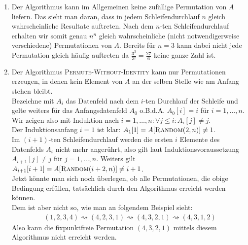 \begin{solution}

\phantom{}

\begin{enumerate}[label = \alph*)]
  \item Der Algorithmus kann im Allgemeinen keine zufällige Permutation von $A$ liefern.
  Das sieht man daran, dass in jedem Schleifendurchlauf $n$ gleich wahrscheinliche
  Resultate auftreten. Nach dem $n$-ten Schleifendurchlauf erhalten wir somit
  genau $n^n$ gleich wahrscheinliche (nicht notwendigerweise verschiedene) Permutationen von $A$. Bereits für $n = 3$
  kann dabei nicht jede Permutation gleich häufig auftreten da $\frac{3^3}{3!} = \frac{27}{6}$
  keine ganze Zahl ist.
  \item Der Algorithmus \textsc{Permute-Without-Identity} kann nur Permutationen
  erzeugen, in denen kein Element von $A$ an der selben Stelle wie am Anfang stehen bleibt. \\
  Bezeichne mit $A_i$ das Datenfeld nach dem $i$-ten Durchlauf der Schleife und
  gelte weiters für das Anfangsdatenfeld $A_0$ o.B.d.A. $A_0[i] = i$ für $i = 1,\dots,n$. \\
  Wir zeigen also mit Induktion nach $i = 1,\dots,n: \forall j \leq i: A_i[j] \neq j$. \\
  Der Induktionsanfang $i = 1$ ist klar: $A_1[1] = A[\textsc{Random}(2,n)] \neq 1$. \\
  Im $(i+1)$-ten Schleifendurchlauf werden die ersten $i$ Elemente des Datenfelds $A_i$
  nicht mehr angerührt, also gilt laut Induktionsvoraussetzung $A_{i+1}[j] \neq j$
  für $j = 1,\dots,n$. Weiters gilt $A_{i+1}[i+1] = A[\textsc{Random}(i+2,n)] \neq i +1$. \\
  Jetzt könnte man sich noch überlegen, ob alle Permutationen, die obige
  Bedingung erfüllen, tatsächlich durch den Algorithmus erreicht werden können. \\
  Dem ist aber nicht so, wie man an folgendem Beispiel sieht:
  \begin{align*}
    (1,2,3,4) \rightsquigarrow (4,2,3,1) \rightsquigarrow (4,3,2,1)
    \rightsquigarrow (4,3,1,2)
  \end{align*}
  Also kann die fixpunktfreie Permutation $(4,3,2,1)$ mittels diesem Algorithmus
  nicht erreicht werden.
\end{enumerate}

\end{solution}
